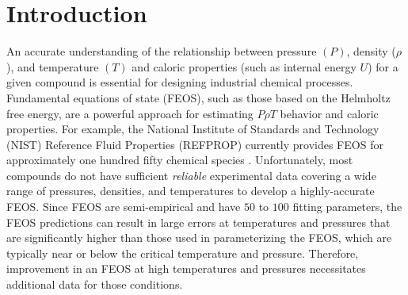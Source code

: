 \documentclass[preprint,letterpaper,floatfix,citeautoscript,aip,jcp]{revtex4-1}
\begin{document}
\section{Introduction}

An accurate understanding of the relationship between pressure $(P)$, 
density ($\rho$), and temperature $(T)$ and caloric properties 
(such as internal energy $U$) for a given compound is essential for designing industrial chemical processes. Fundamental equations of state (FEOS), such as those based on the Helmholtz free energy, are a powerful approach for estimating $P \rho T$ behavior and caloric properties. For example, the National Institute of Standards and Technology (NIST) Reference Fluid Properties (REFPROP) currently provides FEOS for approximately one hundred fifty chemical species \cite{LEMMON-RP91}. Unfortunately, most compounds do not have sufficient 
\textit{reliable} experimental data covering a wide range of pressures, densities, and temperatures to develop a highly-accurate FEOS. Since FEOS are semi-empirical and have $50$ to $100$ fitting parameters, the FEOS predictions can result in large errors at temperatures and pressures that are significantly higher than those used in parameterizing the FEOS, which are typically near or below the critical temperature and pressure. Therefore, improvement in an FEOS at high temperatures and pressures necessitates additional data for those conditions.
\end{document}
